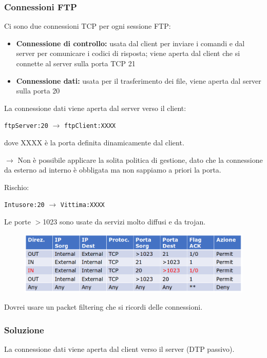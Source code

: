 \subsubsection{Connessioni FTP}
Ci sono due connessioni TCP per ogni sessione FTP:
\begin{itemize}
    \item \textbf{Connessione di controllo:} usata dal client per inviare i comandi e 
    dal server per comunicare i codici di risposta; viene aperta dal client che si connette 
    al server sulla porta TCP 21 
    \item \textbf{Connessione dati:} usata per il trasferimento dei file, viene aperta 
    dal server sulla porta 20
\end{itemize} 

\noindent La connessione dati viene aperta dal server verso il client:
\begin{center}
    \texttt{ftpServer:20} $\rightarrow$ \texttt{ftpClient:XXXX}
\end{center}

\noindent dove XXXX è la porta definita dinamicamente dal client.

\noindent $\rightarrow$ Non è possibile applicare la solita politica di gestione, dato che 
la connessione da esterno ad interno è obbligata ma non sappiamo a priori la porta.

\noindent Rischio:
\begin{center}
    \texttt{Intusore:20} $\rightarrow$ \texttt{Vittima:XXXX}
\end{center}

\noindent Le porte $>$1023 sono usate da servizi molto diffusi e da trojan.

\begin{figure}[H]
    \centering
    \includegraphics[width=1\linewidth]{chapters/12/images/ftp1.png}
\end{figure}

\noindent Dovrei usare un packet filtering che si ricordi delle connessioni.
\subsubsection{Soluzione}
La connessione dati viene aperta dal client verso il server (DTP passivo).

